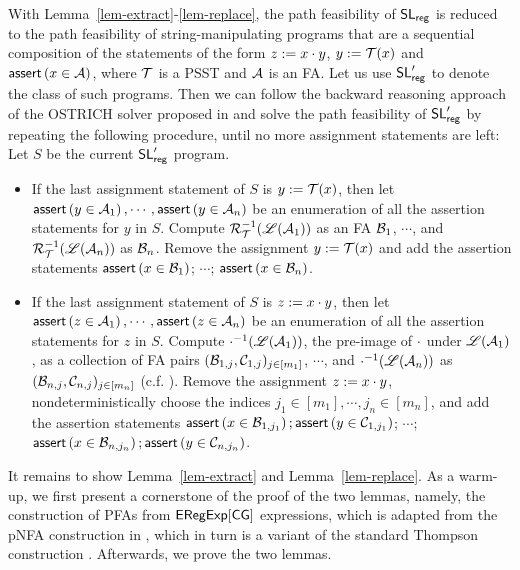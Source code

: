 With Lemma~\ref{lem-extract}-\ref{lem-replace}, the path feasibility of $\mathsf{SL}_{\sf reg}$ is reduced to the path feasibility of string-manipulating programs that are a sequential composition of the statements of the form $z:=x \cdot y$, $y:=\mathcal{T}(x)$ and $\textsf{assert}\left(x \in \mathcal{A}\right)$, where $\mathcal{T}$ is a PSST and $\mathcal{A}$ is an FA. Let us use  $\mathsf{SL}'_{\sf reg}$ to denote the class of such programs. Then we can follow the backward reasoning approach of the OSTRICH solver proposed in \cite{CCH+18,CHL+19} and solve the path feasibility of $\mathsf{SL}'_{\sf reg}$ by repeating the following procedure, until no more assignment statements are left:\\
Let $S$ be the current $\mathsf{SL}'_{\sf reg}$ program.
\begin{itemize}
\item If the last assignment statement of $S$ is $y:=\mathcal{T}(x)$, then let $\textsf{assert}\left(y \in \mathcal{A}_1\right), \cdots, \textsf{assert}\left(y \in \mathcal{A}_n\right)$ be an enumeration of all the assertion statements for $y$ in $S$. Compute $\mathcal{R}^{-1}_{\mathcal{T}}(\mathscr{L}(\mathcal{A}_1))$ as an FA $\mathcal{B}_1$, $\cdots$, and $\mathcal{R}^{-1}_{\mathcal{T}}(\mathscr{L}(\mathcal{A}_n))$ as $\mathcal{B}_n$. Remove  the assignment  $y:=\mathcal{T}(x)$ and add the assertion statements $\textsf{assert}\left(x \in \mathcal{B}_1\right)$; $\cdots$; $\textsf{assert}\left(x \in \mathcal{B}_n\right)$. 
%
\item If the last assignment statement of $S$ is $z:=x \cdot y$, then let $\textsf{assert}\left(z \in \mathcal{A}_1\right), \cdots, \textsf{assert}\left(z \in \mathcal{A}_n\right)$ be an enumeration of all the assertion statements for $z$ in $S$. Compute $\cdot^{-1}(\mathscr{L}(\mathcal{A}_1))$, the pre-image of $\cdot$ under $\mathscr{L}(\mathcal{A}_1)$, as a collection of FA pairs $(\mathcal{B}_{1,j}, \mathcal{C}_{1,j})_{j \in [m_1]}$, $\cdots$, and $\cdot^{-1}(\mathscr{L}(\mathcal{A}_n))$ as $(\mathcal{B}_{n, j}, \mathcal{C}_{n,j})_{j \in [m_n]}$ (c.f. \cite{CHL+19}). Remove the assignment $z:=x \cdot y$, nondeterministically choose the indices $j_1 \in [m_1], \cdots, j_n \in [m_n]$, and add the assertion statements $\textsf{assert}\left(x \in \mathcal{B}_{1,j_1}\right); \textsf{assert}\left(y \in \mathcal{C}_{1, j_1}\right)$; $\cdots$; $\textsf{assert}\left(x \in \mathcal{B}_{n,j_n}\right); \textsf{assert}\left(y \in \mathcal{C}_{n, j_n}\right)$. 
\end{itemize}

It remains to show Lemma~\ref{lem-extract} and Lemma~\ref{lem-replace}. As a warm-up, we first present a cornerstone of the proof of the two lemmas, namely, the construction of PFAs from ${\sf ERegExp}[\sf CG]$ expressions, which is adapted from the pNFA construction in \cite{BDM14}, which in turn is a variant of the standard
Thompson construction \cite{Thompson68}. 
Afterwards, we prove the two lemmas. 


